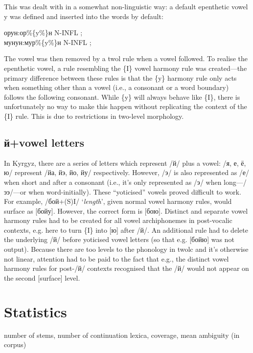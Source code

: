 \documentclass[a4paper,12pt,onecolumn,oneside]{article}
\newcommand{\eng}[1]{`{\em #1}'}
\begin{document}
This was dealt with in a somewhat non-linguistic way: a default epenthetic vowel {y} was defined and inserted into the words by default:

\noindent орун:ор\%\{y\%\}н N-INFL ;\\
\noindent мунун:мур\%\{y\%\}н N-INFL ;

The vowel was then removed by a twol rule when a vowel followed.  To realise the epenthetic vowel, a rule resembling the \{I\} vowel harmony rule was created---the primary difference between these rules is that the \{y\} harmony rule only acts when something other than a vowel (i.e., a consonant or a word boundary) follows the following consonant.  While \{y\} will always behave like \{I\}, there is unfortunately no way to make this happen without replicating the context of the \{I\} rule.  This is due to restrictions in two-level morphology.

\subsection{й+vowel letters}

In Kyrgyz, there are a series of letters which represent /й/ plus a vowel: /я, е, ё, ю/ represent /йа, йэ, йо, йу/ respectively.  However, /э/ is also represented as /е/ when short and after a consonant (i.e., it’s only represented as /э/ when long—/ээ/—or when word-initially).  These ``yoticised'' vowels proved difficult to work.  For example, /бой+(S)I/ \eng{length}, given normal vowel harmony rules, would surface as [бойу].  However, the correct form is [бою].  Distinct and separate vowel harmony rules had to be created for all vowel archiphonemes in post-vocalic contexts, e.g. here to turn \{I\} into [ю] after /й/.  An additional rule had to delete the underlying /й/ before yoticised vowel letters (so that e.g. [бойю] was not output).  Because there are too levels to the phonology in twolc and it’s otherwise not linear, attention had to be paid to the fact that e.g., the distinct vowel harmony rules for post-/й/ contexts recognised that the /й/ would not appear on the second [surface] level.

\section{Statistics}

number of stems, number of continuation lexica, coverage, mean ambiguity (in corpus)
\end{document}
